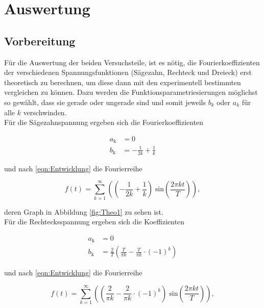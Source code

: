 \section{Auswertung}
\label{sec:Auswertung}

\subsection{Vorbereitung}

Für die Auswertung der beiden Versuchsteile, ist es nötig, die Fourierkoeffizienten der verschiedenen
Spannungsfunktionen (Sägezahn, Rechteck und Dreieck) erst theoretisch zu berechnen,
um diese dann mit den experimentell bestimmten vergleichen zu können. Dazu werden die Funktionsparametriesierungen
möglichst so gewählt, dass sie gerade oder ungerade sind und somit jeweils $b_k$ oder $a_k$ für alle $k$ verschwinden. \\

Für die Sägezahnspannung ergeben sich die Fourierkoeffizienten

\begin{align*}
    a_\text{k} &= 0 \\
    b_\text{k} &= - \frac{1}{2k} + \frac{1}{k}
\end{align*}

und nach \eqref{eqn:Entwicklung} die Fourierreihe

\begin{equation*}
    f(t) = \sum^\infty_{k = 1} \left( \left( - \frac{1}{2k} + \frac{1}{k} \right) \; \text{sin}
    \left(\frac{2 \pi k t}{T} \right) \right)   ,
\end{equation*}

deren Graph in Abbildung \ref{fig:Theo1} zu sehen ist. \\

Für die Rechtecksspannung ergeben sich die Koeffizienten

\begin{align*}
    a_\text{k} &= 0 \\
    b_\text{k} &= \frac{2}{T} \left(\frac{T}{\pi k} - \frac{T}{\pi k} \cdot (-1)^k \right)
\end{align*}

und nach \eqref{eqn:Entwicklung} die Fourierreihe

\begin{equation*}
    f(t) = \sum^\infty_{k = 1} \left(\left(\frac{2}{\pi k} - \frac{2}{\pi k} \cdot (-1)^k \right) \; \text{sin}
    \left(\frac{2 \pi k t}{T} \right) \right)   ,
\end{equation*}

